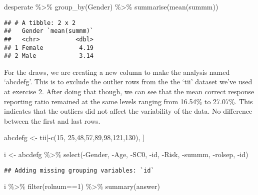 \documentclass[
]{article}
\newenvironment{Shaded}{\begin{snugshade}}{\end{snugshade}}
\newcommand{\DecValTok}[1]{\textcolor[rgb]{0.00,0.00,0.81}{#1}}
\newcommand{\FunctionTok}[1]{\textcolor[rgb]{0.00,0.00,0.00}{#1}}
\newcommand{\NormalTok}[1]{#1}
\newcommand{\OtherTok}[1]{\textcolor[rgb]{0.56,0.35,0.01}{#1}}
\newcommand{\SpecialCharTok}[1]{\textcolor[rgb]{0.00,0.00,0.00}{#1}}
\begin{document}
\begin{enumerate}
\begin{Shaded}
\begin{Highlighting}[]
\NormalTok{desperate }\SpecialCharTok{\%\textgreater{}\%} \FunctionTok{group\_by}\NormalTok{(Gender) }\SpecialCharTok{\%\textgreater{}\%} \FunctionTok{summarise}\NormalTok{(}\FunctionTok{mean}\NormalTok{(summm))}
\end{Highlighting}
\end{Shaded}

\begin{verbatim}
## # A tibble: 2 x 2
##   Gender `mean(summm)`
##   <chr>          <dbl>
## 1 Female          4.19
## 2 Male            3.14
\end{verbatim}

  For the draws, we are creating a new column to make the analysis named
  `abcdefg'. This is to exclude the outlier rows from the the `tii'
  dataset we've used at exercise 2. After doing that though, we can see
  that the mean correct response reporting ratio remained at the same
  levels ranging from 16.54\% to 27.07\%. This indicates that the
  outliers did not affect the variability of the data. No difference
  between the first and last rows.

\begin{Shaded}
\begin{Highlighting}[]
\NormalTok{abcdefg }\OtherTok{\textless{}{-}}\NormalTok{ tii[}\SpecialCharTok{{-}}\FunctionTok{c}\NormalTok{(}\DecValTok{15}\NormalTok{, }\DecValTok{25}\NormalTok{,}\DecValTok{48}\NormalTok{,}\DecValTok{57}\NormalTok{,}\DecValTok{89}\NormalTok{,}\DecValTok{98}\NormalTok{,}\DecValTok{121}\NormalTok{,}\DecValTok{130}\NormalTok{), ]}

\NormalTok{i }\OtherTok{\textless{}{-}}\NormalTok{ abcdefg }\SpecialCharTok{\%\textgreater{}\%} \FunctionTok{select}\NormalTok{(}\SpecialCharTok{{-}}\NormalTok{Gender, }\SpecialCharTok{{-}}\NormalTok{Age, }\SpecialCharTok{{-}}\NormalTok{SC0, }\SpecialCharTok{{-}}\NormalTok{id, }\SpecialCharTok{{-}}\NormalTok{Risk, }\SpecialCharTok{{-}}\NormalTok{summm, }\SpecialCharTok{{-}}\NormalTok{rolsep, }\SpecialCharTok{{-}}\NormalTok{id)}
\end{Highlighting}
\end{Shaded}

\begin{verbatim}
## Adding missing grouping variables: `id`
\end{verbatim}

\begin{Shaded}
\begin{Highlighting}[]
\NormalTok{i }\SpecialCharTok{\%\textgreater{}\%} \FunctionTok{filter}\NormalTok{(rolnum}\SpecialCharTok{==}\DecValTok{1}\NormalTok{) }\SpecialCharTok{\%\textgreater{}\%} \FunctionTok{summary}\NormalTok{(answer)}
\end{Highlighting}
\end{Shaded}


\end{enumerate}
\end{document}
